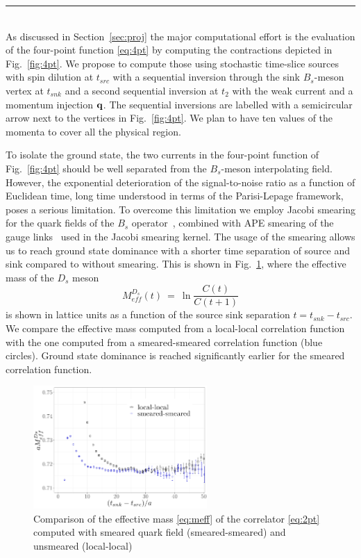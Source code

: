 \label{sec:algos}
\rule{\textwidth}{0.4pt}\\

As discussed in Section~\ref{sec:proj} the major computational effort is 
the evaluation of the four-point function \eqref{eq:4pt} by computing the
contractions depicted in Fig.~\ref{fig:4pt}.
We propose to compute those using stochastic time-slice sources with
spin dilution at $t_{src}$ with a sequential inversion through the
sink $B_s$-meson vertex at $t_{snk}$ and a second sequential inversion
at $t_2$ with the weak current and a momentum injection ${\bf q}$.
The sequential inversions are labelled with a semicircular arrow next to
the vertices in Fig.~\ref{fig:4pt}. We plan to have ten values of the
momenta to cover all the physical region.

To isolate the ground state, the two currents in the
four-point function of Fig.~\ref{fig:4pt} should be well separated
from the $B_s$-meson interpolating field. However, the exponential
deterioration of the signal-to-noise ratio as a function of Euclidean
time, long time understood in terms of the Parisi-Lepage framework,
poses a serious limitation. To overcome this limitation we employ
Jacobi smearing for the quark fields of the $B_s$
operator~\cite{Allton:1993wc}, combined with APE smearing of the gauge
links~\cite{FALCIONI1985624} used in the Jacobi smearing kernel.  
The usage of the smearing allows us to reach ground state dominance 
with a shorter time separation of source and sink compared to without
smearing. This is shown in Fig.~\ref{fig:smearing}, where the
effective mass of the $D_s$ meson
\begin{equation}\label{eq:meff}
	M_{eff}^{D_s}(t)\ =\ \ln\frac{C(t)}{C(t+1)}	
\end{equation}
is shown in lattice units as a function of the source sink separation $t=t_{snk}-t_{src}$. We compare the effective mass
computed from a local-local correlation function with the one computed from
a smeared-smeared correlation function (blue circles). Ground state
dominance is reached significantly earlier for the smeared correlation
function. 
             
\begin{figure}
  \includegraphics[width=0.59\textwidth]{plots/smearing_MDs.pdf}
  \caption{Comparison of the effective mass \eqref{eq:meff} of the correlator
    \eqref{eq:2pt}  computed with
    smeared quark field (smeared-smeared) and unsmeared (local-local)} 
  \label{fig:smearing}
\end{figure}

